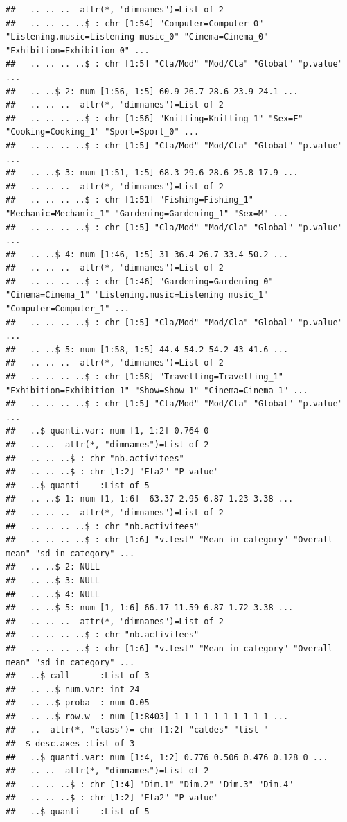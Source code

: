 \documentclass[]{book}
\begin{document}
\begin{verbatim}
##   .. .. ..- attr(*, "dimnames")=List of 2
##   .. .. .. ..$ : chr [1:54] "Computer=Computer_0" "Listening.music=Listening music_0" "Cinema=Cinema_0" "Exhibition=Exhibition_0" ...
##   .. .. .. ..$ : chr [1:5] "Cla/Mod" "Mod/Cla" "Global" "p.value" ...
##   .. ..$ 2: num [1:56, 1:5] 60.9 26.7 28.6 23.9 24.1 ...
##   .. .. ..- attr(*, "dimnames")=List of 2
##   .. .. .. ..$ : chr [1:56] "Knitting=Knitting_1" "Sex=F" "Cooking=Cooking_1" "Sport=Sport_0" ...
##   .. .. .. ..$ : chr [1:5] "Cla/Mod" "Mod/Cla" "Global" "p.value" ...
##   .. ..$ 3: num [1:51, 1:5] 68.3 29.6 28.6 25.8 17.9 ...
##   .. .. ..- attr(*, "dimnames")=List of 2
##   .. .. .. ..$ : chr [1:51] "Fishing=Fishing_1" "Mechanic=Mechanic_1" "Gardening=Gardening_1" "Sex=M" ...
##   .. .. .. ..$ : chr [1:5] "Cla/Mod" "Mod/Cla" "Global" "p.value" ...
##   .. ..$ 4: num [1:46, 1:5] 31 36.4 26.7 33.4 50.2 ...
##   .. .. ..- attr(*, "dimnames")=List of 2
##   .. .. .. ..$ : chr [1:46] "Gardening=Gardening_0" "Cinema=Cinema_1" "Listening.music=Listening music_1" "Computer=Computer_1" ...
##   .. .. .. ..$ : chr [1:5] "Cla/Mod" "Mod/Cla" "Global" "p.value" ...
##   .. ..$ 5: num [1:58, 1:5] 44.4 54.2 54.2 43 41.6 ...
##   .. .. ..- attr(*, "dimnames")=List of 2
##   .. .. .. ..$ : chr [1:58] "Travelling=Travelling_1" "Exhibition=Exhibition_1" "Show=Show_1" "Cinema=Cinema_1" ...
##   .. .. .. ..$ : chr [1:5] "Cla/Mod" "Mod/Cla" "Global" "p.value" ...
##   ..$ quanti.var: num [1, 1:2] 0.764 0
##   .. ..- attr(*, "dimnames")=List of 2
##   .. .. ..$ : chr "nb.activitees"
##   .. .. ..$ : chr [1:2] "Eta2" "P-value"
##   ..$ quanti    :List of 5
##   .. ..$ 1: num [1, 1:6] -63.37 2.95 6.87 1.23 3.38 ...
##   .. .. ..- attr(*, "dimnames")=List of 2
##   .. .. .. ..$ : chr "nb.activitees"
##   .. .. .. ..$ : chr [1:6] "v.test" "Mean in category" "Overall mean" "sd in category" ...
##   .. ..$ 2: NULL
##   .. ..$ 3: NULL
##   .. ..$ 4: NULL
##   .. ..$ 5: num [1, 1:6] 66.17 11.59 6.87 1.72 3.38 ...
##   .. .. ..- attr(*, "dimnames")=List of 2
##   .. .. .. ..$ : chr "nb.activitees"
##   .. .. .. ..$ : chr [1:6] "v.test" "Mean in category" "Overall mean" "sd in category" ...
##   ..$ call      :List of 3
##   .. ..$ num.var: int 24
##   .. ..$ proba  : num 0.05
##   .. ..$ row.w  : num [1:8403] 1 1 1 1 1 1 1 1 1 1 ...
##   ..- attr(*, "class")= chr [1:2] "catdes" "list "
##  $ desc.axes :List of 3
##   ..$ quanti.var: num [1:4, 1:2] 0.776 0.506 0.476 0.128 0 ...
##   .. ..- attr(*, "dimnames")=List of 2
##   .. .. ..$ : chr [1:4] "Dim.1" "Dim.2" "Dim.3" "Dim.4"
##   .. .. ..$ : chr [1:2] "Eta2" "P-value"
##   ..$ quanti    :List of 5

\end{verbatim}
\end{document}
